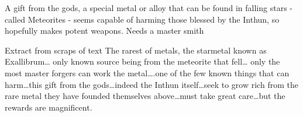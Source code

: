 \noindent 

A gift from the gods, a special metal or alloy that can be found in falling stars - called Meteorites - seems capable of harming those blessed by the Inthun, so hopefully makes potent weapons. Needs a master smith

\begin{DndComment}{Extract from scraps of text}
The rarest of metals, the starmetal known as Exallibrum… only known source being from the meteorite that fell… only the most master forgers can work the metal….one of the few known things that can harm…this gift from the gods…indeed the Inthun itself…seek to grow rich from the rare metal they have founded themselves above…must take great care…but the rewards are magnificent.
\end{DndComment}

\smallskip


\clearpage